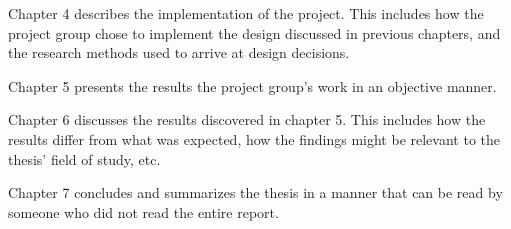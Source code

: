 Chapter 4 describes the implementation of the project.
This includes how the project group chose to implement the design discussed in previous chapters, and the research methods used to arrive at design decisions.

Chapter 5 presents the results the project group's work in an objective manner.

Chapter 6 discusses the results discovered in chapter 5.
This includes how the results differ from what was expected, how the findings might be relevant to the thesis' field of study, etc.

Chapter 7 concludes and summarizes the thesis in a manner that can be read by someone who did not read the entire report.





